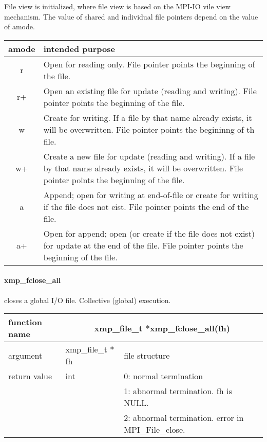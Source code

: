    File view is initialized, where file view is based on the MPI-IO vile view mechanism. The value of shared and individual file pointers 
   depend on the value of amode.

   \begin{table}
     \begin{center}
    \label{tb:xxx}
    \begin{tabular}{|c|p{120mm}|}
      \hline
     amode & intended purpose \\ \hline \hline
     r &  Open for reading only. File pointer points the beginning of
	 the file.\\ \hline
     r+ & Open an existing file for update (reading and writing). File
	 pointer points the beginning of the file. \\ \hline
     w &  Create for writing. If a file by that name already exists, it
	 will be overwritten. File pointer points the begininng of th file. \\ \hline
     w+ & Create a new file for update (reading and writing). If a file
	 by that name already exists, it will be overwritten. File
	 pointer points the beginning of the file. \\ \hline
     a & Append; open for writing at end-of-file or create for writing
	 if the file does not eist. File pointer points the end of the file. \\ \hline
     a+ & Open for append; open (or create if the file does not exist)
	 for update at the end of the file. File pointer points the
	 beginning of the file. \\ \hline
    \end{tabular}
   \end{center}
   \end{table}


   \clearpage
   \paragraph{xmp\_fclose\_all} closes a global I/O file. Collective (global) execution.

   \begin{table}[h]
    \begin{center}
     \begin{tabular}{|l|l|p{80mm}|}
      \hline
      {\bf function name}  & \multicolumn{2}{c|}{\bf xmp\_file\_t
      $*$xmp\_fclose\_all(fh)} \\ \hline \hline
      argument & xmp\_file\_t $*$fh & file structure \\ \hline
      return value & int & 0: normal termination \\
      &  & 1: abnormal termination. fh is NULL. \\
      &  & 2: abnormal termination. error in MPI\_File\_close. \\ \hline
      \end{tabular}
     \end{center}
    \label{tb:close}
   \end{table}

